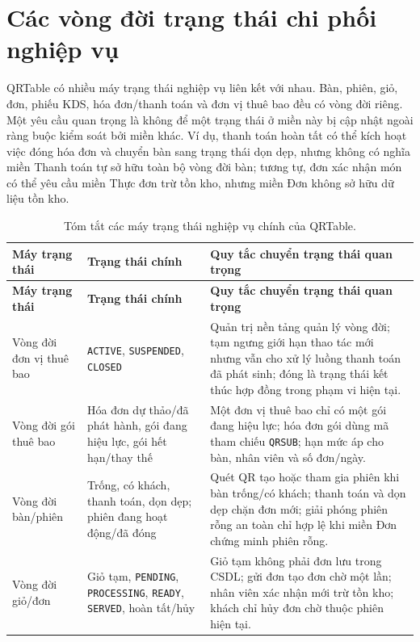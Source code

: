 \section{Các vòng đời trạng thái chi phối nghiệp vụ}

QRTable có nhiều máy trạng thái nghiệp vụ liên kết với nhau. Bàn, phiên, giỏ, đơn, phiếu KDS, hóa đơn/thanh toán và đơn vị thuê bao đều có vòng đời riêng. Một yêu cầu quan trọng là không để một trạng thái ở miền này bị cập nhật ngoài ràng buộc kiểm soát bởi miền khác. Ví dụ, thanh toán hoàn tất có thể kích hoạt việc đóng hóa đơn và chuyển bàn sang trạng thái dọn dẹp, nhưng không có nghĩa miền Thanh toán tự sở hữu toàn bộ vòng đời bàn; tương tự, đơn xác nhận món có thể yêu cầu miền Thực đơn trừ tồn kho, nhưng miền Đơn không sở hữu dữ liệu tồn kho.

\begin{longtable}{@{}>{\raggedright\arraybackslash}p{}>{\raggedright\arraybackslash}p{}>{\raggedright\arraybackslash}p{}@{}}
\caption{Tóm tắt các máy trạng thái nghiệp vụ chính của QRTable.}
\label{tab:chapter3-state-machines}\\
\toprule
\textbf{Máy trạng thái} & \textbf{Trạng thái chính} & \textbf{Quy tắc chuyển trạng thái quan trọng} \\
\midrule
\endfirsthead
\toprule
\textbf{Máy trạng thái} & \textbf{Trạng thái chính} & \textbf{Quy tắc chuyển trạng thái quan trọng} \\
\midrule
\endhead
Vòng đời đơn vị thuê bao & \texttt{ACTIVE}, \texttt{SUSPENDED}, \texttt{CLOSED} & Quản trị nền tảng quản lý vòng đời; tạm ngưng giới hạn thao tác mới nhưng vẫn cho xử lý luồng thanh toán đã phát sinh; đóng là trạng thái kết thúc hợp đồng trong phạm vi hiện tại. \\
\addlinespace
Vòng đời gói thuê bao & Hóa đơn dự thảo/đã phát hành, gói đang hiệu lực, gói hết hạn/thay thế & Một đơn vị thuê bao chỉ có một gói đang hiệu lực; hóa đơn gói dùng mã tham chiếu \texttt{QRSUB}; hạn mức áp cho bàn, nhân viên và số đơn/ngày. \\
\addlinespace
Vòng đời bàn/phiên & Trống, có khách, thanh toán, dọn dẹp; phiên đang hoạt động/đã đóng & Quét QR tạo hoặc tham gia phiên khi bàn trống/có khách; thanh toán và dọn dẹp chặn đơn mới; giải phóng phiên rỗng an toàn chỉ hợp lệ khi miền Đơn chứng minh phiên rỗng. \\
\addlinespace
Vòng đời giỏ/đơn & Giỏ tạm, \texttt{PENDING}, \texttt{PROCESSING}, \texttt{READY}, \texttt{SERVED}, hoàn tất/hủy & Giỏ tạm không phải đơn lưu trong CSDL; gửi đơn tạo đơn chờ một lần; nhân viên xác nhận mới trừ tồn kho; khách chỉ hủy đơn chờ thuộc phiên hiện tại. \\

\end{longtable}
